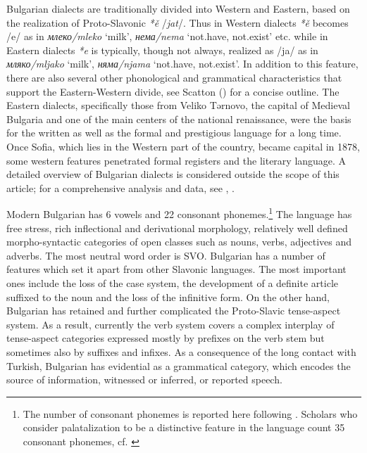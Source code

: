 \documentclass[output=paper,colorlinks=true, citecolor=brown]{langscibook}
\begin{document}
Bulgarian dialects are traditionally divided into Western and Eastern, based on the realization of Proto-Slavonic \textit{*ě} /\textit{jat}/. Thus in Western dialects \textit{*ě} becomes /e/ as in \textit{млеко/mleko} `milk', \textit{нема/nema} `not.have, not.exist' etc. while in Eastern dialects \textit{*e} is typically, though not always, realized as /ja/ as in \textit{мляко/mljako} `milk', \textit{няма/njama} `not.have, not.exist'. In addition to this feature, there are also several other phonological and grammatical characteristics that support the Eastern-Western divide, see Scatton (\citeyear[244--245]{Scatton1993}) for a concise outline. The Eastern dialects, specifically those from Veliko Tərnovo, the capital of Medieval Bulgaria and one of the main centers of the national renaissance, were the basis for the written as well as the formal and prestigious language for a long time. Once Sofia, which lies in the Western part of the country, became capital in 1878, some western features penetrated formal registers and the literary language. A detailed overview of Bulgarian dialects is considered outside the scope of this article; for a comprehensive analysis and data, see \citet{StoykovMladenov1993}, \citet{AntonovaEtAl2016}. 

Modern Bulgarian has 6 vowels and 22 consonant phonemes.\footnote{The number of consonant phonemes is reported here following \citet{Maddieson2013-wals-1}. Scholars who consider palatalization to be a distinctive feature in the language count 35 consonant phonemes, cf. \citet[191]{Scatton1993}} The language has free stress, rich inflectional and derivational morphology, relatively well defined morpho-syntactic categories of open classes such as nouns, verbs, adjectives and adverbs. The most neutral word order is SVO. Bulgarian has a number of features which set it apart from other Slavonic languages. The most important ones include the loss of the case system, the development of a definite article suffixed to the noun and the loss of the infinitive form. On the other hand, Bulgarian has retained and further complicated the Proto-Slavic tense-aspect system. As a result, currently the verb system covers a complex interplay of tense-aspect categories expressed mostly by prefixes on the verb stem but sometimes also by suffixes and infixes. As a consequence of the long contact with Turkish, Bulgarian has evidential as a grammatical category, which encodes the source of information, witnessed or inferred, or reported speech.
\end{document}
